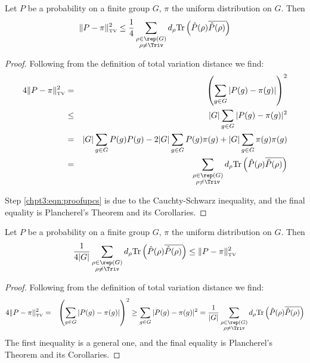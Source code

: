 \documentclass[11pt]{report}
\begin{document}
\begin{lemma}
	\label{chpt3:lem:upperboundlemma}
	Let $P$ be a probability on a finite group $G$, $\pi$ the uniform 
	distribution on $G$. Then
	\begin{eqnarray}
	\label{chpt3:eqn:upperbound}
	\lVert P - \pi \rVert_{\textnormal{\tiny TV}}^{2} \leq 
	\frac{1}{4}\sum_{\substack{\rho \in \rep(G) \\ \rho \neq \Triv}} 
	d_{\rho} \textnormal{Tr}\left( 
	\hat{P}(\rho)\overline{\hat{P}(\rho)}\right)
	\end{eqnarray}
	
\end{lemma}

\begin{proof}
	Following from the definition of total variation distance we find:
	\begin{eqnarray}
	4\lVert P - \pi \rVert_{\textnormal{\tiny TV}}^{2} & = &\left(\sum_{g\in G} 
	|P(g) -\pi(g)|\right)^{2} \nonumber\\
	& \leq & |G|\sum_{g \in G} |P(g) -\pi(g)|^{2} \label{chpt3:eqn:proofupcs}\\
	& = & |G|\sum_{g \in G} P(g)P(g) - 2 |G|\sum_{g \in G} P(g)\pi(g) 
	+|G|\sum_{g \in G} \pi(g)\pi(g) \nonumber \\
	& = & \sum_{\substack{\rho \in \rep(G) \\ \rho \neq \Triv}} 
	d_{\rho} \textnormal{Tr}\left( 	\hat{P}(\rho)\overline{\hat{P}(\rho)}\right)
	\end{eqnarray}
	
	Step \eqref{chpt3:eqn:proofupcs} is due to the Cauchty-Schwarz inequality, 
	and the final equality is Plancherel's Theorem and its Corollaries.
\end{proof}


\begin{lemma}
	\label{chpt2:lem:upperboundlemma}
	Let $P$ be a probability on a finite group $G$, $\pi$ the uniform distribution on $G$.
	Then
	\begin{eqnarray}
	\label{chpt3:eqn:lowerbound} 
	\frac{1}{4|G|}\sum_{\substack{\rho \in \rep(G) \\ \rho \neq \Triv}} 
	d_{\rho} \textnormal{Tr}\left( 
	\hat{P}(\rho)\overline{\hat{P}(\rho)}\right) \leq \lVert P - \pi \rVert_{\textnormal{\tiny TV}}^{2}
	\end{eqnarray}
\end{lemma}

\begin{proof}
	Following from the definition of total variation distance we find:
	\begin{eqnarray*}
		4\lVert P - \pi \rVert_{\textnormal{\tiny TV}}^{2} & = &\left(\sum_{g\in G} 
		|P(g) -\pi(g)|\right)^{2} 
		\geq  \sum_{g \in G} |P(g) -\pi(g)|^{2} 
		=  \frac{1}{|G|}\sum_{\substack{\rho \in \rep(G) \\ \rho \neq \Triv}} 
		d_{\rho} \textnormal{Tr}\left( 
		\hat{P}(\rho)\overline{\hat{P}(\rho)}\right)
	\end{eqnarray*}
	The first inequality is a general one, 
	and the final equality is Plancherel's Theorem and its Corollaries.
\end{proof}
\end{document}
